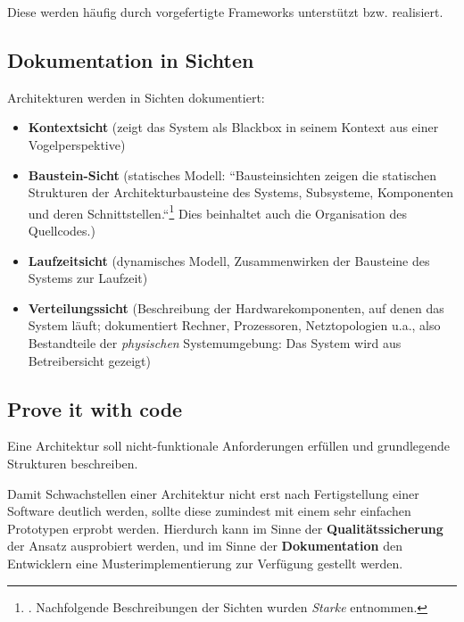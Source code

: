 \noindent
Diese werden häufig durch vorgefertigte Frameworks unterstützt bzw. realisiert.

\subsection*{Dokumentation in Sichten}
Architekturen werden in Sichten dokumentiert:

\begin{itemize}
    \item \textbf{Kontextsicht} (zeigt das System als Blackbox in seinem Kontext aus einer Vogelperspektive)
    \item \textbf{Baustein-Sicht} (statisches Modell: ``Bausteinsichten zeigen die statischen Strukturen der Architekturbausteine des Systems, Subsysteme, Komponenten und deren Schnittstellen.``\footnote{
        \cite[81]{Sta14e}.
        Nachfolgende Beschreibungen der Sichten wurden \textit{Starke} entnommen.
    } Dies beinhaltet auch die Organisation des Quellcodes.)
    \item \textbf{Laufzeitsicht} (dynamisches Modell, Zusammenwirken der Bausteine des Systems zur Laufzeit)
    \item \textbf{Verteilungssicht} (Beschreibung der Hardwarekomponenten, auf denen das System läuft; dokumentiert Rechner, Prozessoren, Netztopologien u.a., also Bestandteile der \textit{physischen} Systemumgebung: Das System wird aus Betreibersicht gezeigt)
\end{itemize}

\subsection*{Prove it with code}

\begin{tcolorbox}
    Eine Architektur soll nicht-funktionale Anforderungen erfüllen und grundlegende Strukturen beschreiben.
\end{tcolorbox}

\noindent
Damit Schwachstellen einer Architektur nicht erst nach Fertigstellung einer Software deutlich werden, sollte diese zumindest mit einem sehr einfachen Prototypen erprobt werden.
Hierdurch kann im Sinne der \textbf{Qualitätssicherung} der Ansatz ausprobiert werden, und im Sinne der \textbf{Dokumentation} den Entwicklern eine Musterimplementierung zur Verfügung gestellt werden.